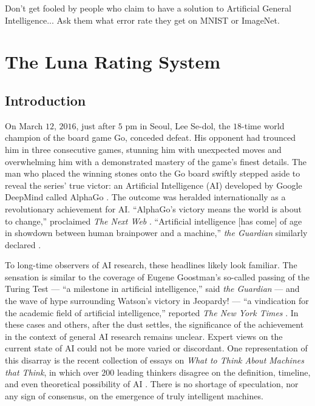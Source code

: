 \begin{savequote}[75mm]
Don't get fooled by people who claim to have a solution to Artificial General Intelligence... Ask them what error rate they get on MNIST or ImageNet.
\end{savequote}


\chapter{The Luna Rating System}

\section{Introduction}

On March $12$, $2016$, just after $5$ pm in Seoul, Lee Se-dol, the $18$-time world champion of the board game Go, conceded defeat. His opponent had trounced him in three consecutive games, stunning him with unexpected moves and overwhelming him with a demonstrated mastery of the game's finest details. The man who placed the winning stones onto the Go board swiftly stepped aside to reveal the series' true victor: an Artificial Intelligence (AI) developed by Google DeepMind called AlphaGo \citep{silver2016mastering}. The outcome was heralded internationally as a revolutionary achievement for AI. ``AlphaGo's victory means the world is about to change,'' proclaimed \textit{The Next Web} \citep{1_nextweb_2016}. ``Artificial intelligence [has come] of age in showdown between human brainpower and a machine,'' \textit{the Guardian} similarly declared \citep{1_the_guardian_2016}. 

To long-time observers of AI research, these headlines likely look familiar. The sensation is similar to the coverage of Eugene Goostman's so-called passing of the Turing Test --- ``a milestone in artificial intelligence,'' said \textit{the Guardian} \citep{1_the_guardian_2014, occasional_pamphlet_2014} --- and the wave of hype surrounding Watson's victory in Jeopardy! --- ``a vindication for the academic field of artificial intelligence,'' reported \textit{The New York Times} \citep{1_newyorktimes_2011}. In these cases and others, after the dust settles, the significance of the achievement in the context of general AI research remains unclear. Expert views on the current state of AI could not be more varied or discordant. One representation of this disarray is the recent collection of essays on \textit{What to Think About Machines that Think}, in which over $200$ leading thinkers disagree on the definition, timeline, and even theoretical possibility of AI  \citep{edge2016what}. There is no shortage of speculation, nor any sign of consensus, on the emergence of truly intelligent machines.

